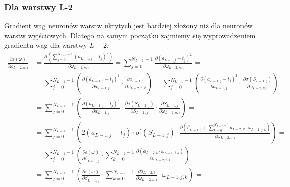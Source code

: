 \documentclass[]{article}
\begin{document}
		\subsubsection{Dla warstwy L-2}
			Gradient wag neuronów warstw ukrytych jest bardziej złożony niż dla neuronów warstw wyjściowych. Dlatego na samym początku zajmiemy się wyprowadzeniem gradientu wag dla warstwy $L-2$:
			\begin{equation} \label{eq:gradientweighthidden:L-2}
				\begin{split}
					\frac{ \partial \varepsilon\left( \omega \right) }{ \partial \omega_{L-2,n,i} } &=
					 \frac{ \partial \left( \sum\limits_{j=0}^{N_{L-1}-1} \left( a_{L-1,j} - t_{j} \right)^{2} \right) }{ \partial \omega_{L-2,n,i} } = \sum\limits_{j=0}^{N_{L-1}-1} \frac{ \partial \left( a_{L-1,j} - t_{j} \right)^{2} }{ \partial \omega_{L-2,n,i} } = \\
					&= \sum\limits_{j=0}^{N_{L-1}-1} \left( \frac{ \partial \left( a_{L-1,j} - t_{j} \right)^{2} }{ \partial a_{L-1,j} } \cdot \frac{ \partial a_{L-1,j} }{ \partial \omega_{L-2,n,i} } \right) = 
					 \sum\limits_{j=0}^{N_{L-1}-1} \left( \frac{ \partial \left( a_{L-1,j} - t_{j} \right)^{2} }{ \partial a_{L-1,j} } \cdot \frac{ \partial \sigma\left( S_{L-1,j} \right) }{ \partial \omega_{L-2,n,i} } \right) = \\
					&= \sum\limits_{j=0}^{N_{L-1}-1} \left( \frac{ \partial \left( a_{L-1,j} - t_{j} \right)^{2} }{ \partial a_{L-1,j} } \cdot \frac{ \partial \sigma\left( S_{L-1,j} \right) }{ \partial S_{L-1,j} } \cdot \frac{ \partial S_{L-1,j} }{ \partial \omega_{L-2,n,i} } \right) = \\
					&= \sum\limits_{j=0}^{N_{L-1}-1} \left( 2 \left( a_{L-1,j} - t_{j} \right) \cdot \sigma^{\prime}\left( S_{L-1,j} \right) \cdot \frac{ \partial \left( \beta_{L-1,j} + \sum\limits_{k=0}^{ N_{L-2}-1 } a_{L-2,k} \cdot \omega_{L-1,j,k} \right) }{ \partial \omega_{L-2,n,i} } \right) = \\
					&= \sum\limits_{j=0}^{N_{L-1}-1} \left( \frac{ \partial \varepsilon \left( \omega \right) }{ \partial \beta_{L-1,j} } \cdot \sum\limits_{k=0}^{N_{L-2}-1} \frac{ \partial \left( a_{L-2,k} \cdot \omega_{L-1,j,k} \right) }{ \partial \omega_{L-2,n,i} } \right) = \\
					&= \sum\limits_{j=0}^{N_{L-1}-1} \left( \frac{ \partial \varepsilon \left( \omega \right) }{ \partial \beta_{L-1,j} } \cdot \sum\limits_{k=0}^{N_{L-2}-1} \frac{ \partial a_{L-2,k} }{ \partial \omega_{L-2,n,i} } \cdot \omega_{L-1,j,k} \right) = \\

\end{split}
\end{equation}
\end{document}
